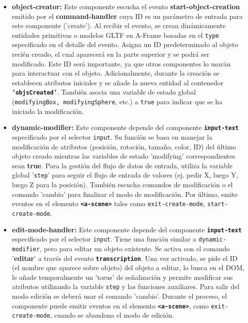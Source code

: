 \documentclass[a4paper, 12pt]{book}
\begin{document}
\begin{itemize}
En resumen, este componente interpreta los comandos hablados y los traduce en acciones concretas dentro de la escena de A-Frame.
  \item \textbf{object-creator:}
Este componente escucha el evento \textbf{start-object-creation} emitido por el \textbf{command-handler} cuya ID es un parámetro de entrada para este componente ('create').
Al recibir el evento, se crean dinámicamente entidades primitivas o modelos GLTF en A-Frame basadas en el \texttt{type} especificado en el detalle del evento. 
Asigna un ID predeterminado al objeto recién creado, el cual aparecerá en la parte superior y se podrá ser modificado.
Este ID será importante, ya que otros componentes lo usarán para interactuar con el objeto.
Adicionalmente, durante la creación se establecen atributos iniciales y se añade la nueva entidad al contenedor \texttt{\textbf{'objsCreated'}}.
También asocia una variable de estado global (\texttt{modifyingBox, modifyingSphere}, etc.) a \texttt{true} para indicar que se ha iniciado la modificación.
  \item \textbf{dynamic-modifier:}
Este componente depende del componente \texttt{\textbf{input-text}} especificado por el selector \texttt{input}.
Su función se basa en manejar la modificación de atributos (posición, rotación, tamaño, color, ID) del último objeto creado mientras las variables de estado 'modifying' correspondientes sean \textbf{true}.
Para la gestión del flujo de datos de entrada, utiliza la variable global '\texttt{step}' para seguir el flujo de entrada de valores (ej. pedir X, luego Y, luego Z para la posición).
También escucha comandos de modificación o el comando 'cambio' para finalizar el modo de modificación.
Por último, emite eventos en el elemento \texttt{\textbf{<a-scene>}} tales como \texttt{exit-create-mode}, \texttt{start-create-mode}.
  \item \textbf{edit-mode-handler:}
Este componente depende del componente \texttt{\textbf{input-text}} especificado por el selector \texttt{input}.
Tiene una función similar a \texttt{dynamic-modifier}, pero para editar un objeto existente.
Se activa con el comando '\textbf{editar}' a través del evento \texttt{\textbf{transcription}}.
Una vez activado, se pide el ID (el nombre que aparece sobre objeto) del objeto a editar, lo busca en el DOM, le añade temporalmente un 'torus' de señalización y permite modificar sus atributos utilizando la variable \texttt{step} y las funciones auxiliares.
Para salir del modo edición se deberá usar el comando 'cambio'.
Durante el proceso, el componente puede emitir eventos en el elemento \texttt{\textbf{<a-scene>}}, como \texttt{exit-create-mode}, cuando se abandona el modo de edición.

\end{itemize}
\end{document}
